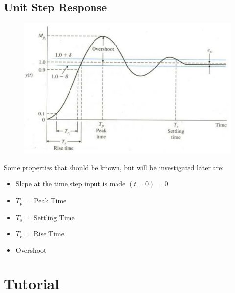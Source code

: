 \documentclass[class=report, crop=false, 12pt,a4paper]{standalone}
\begin{document}
\subsection{Unit Step Response}
\begin{figure}[H]
  \centering
  \includegraphics[width = 0.65 \textwidth]{../img/graphs9.PNG}
\end{figure}
Some properties that should be known, but will be investigated later are:
\begin{itemize}
  \item Slope at the time step input is made $(t=0)$ = 0
  \item $T_p=$ Peak Time
  \item $T_s=$ Settling Time
  \item $T_r=$ Rise Time
  \item Overshoot
\end{itemize}
\section{Tutorial}
\end{document}
